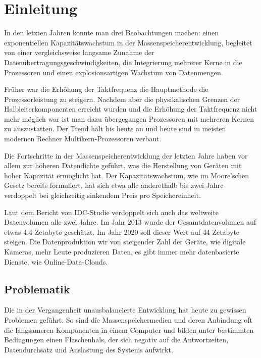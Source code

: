 
\section{Einleitung}
In den letzten Jahren konnte man drei Beobachtungen machen: einen exponentiellen Kapazitätswachstum in der Massenspeicherentwicklung, begleitet von einer vergleichsweise langsame Zunahme der Datenübertragungsgeschwindigkeiten, die Integrierung mehrerer Kerne in die Prozessoren und einen explosionsartigen Wachstum von Datenmengen.

Früher war die Erhöhung der Taktfrequenz die Hauptmethode die Prozessorleistung zu steigern. Nachdem aber die physikalischen Grenzen der Halbleiterkomponenten erreicht wurden und die Erhöhung der Taktfrequenz nicht mehr möglich war ist man dazu übergegangen Prozessoren mit mehreren Kernen zu auszustatten. Der Trend hält bis heute an und heute sind in meisten modernen Rechner Multikern-Prozessoren verbaut.

Die Fortschritte in der Massenspeicherentwicklung der letzten Jahre haben vor allem zur höheren Datendichte geführt, was die Herstellung von Geräten mit hoher Kapazität ermöglicht hat. Der Kapazitätswachstum, wie im Moore'schen Gesetz bereits formuliert, hat sich etwa alle anderethalb bis zwei Jahre verdoppelt bei gleichzeitig sinkendem Preis pro Speichereinheit.

Laut dem Bericht von IDC-Studie \cite{idc} verdoppelt sich auch das weltweite Datenvolumen alle zwei Jahre. Im Jahr 2013 wurde der Gesamtdatenvolumen auf etwas 4.4 Zetabyte geschätzt. Im Jahr 2020 soll dieser Wert auf 44 Zetabyte steigen. Die Datenproduktion wir von steigender Zahl der Geräte, wie digitale Kameras, mehr Leute produzieren Daten, es gibt immer mehr datenbasierte Dienste, wie Online-Data-Clouds.


\subsection{Problematik}
Die in der Vergangenheit unausbalancierte Entwicklung hat heute zu gewissen Problemen geführt.
So sind die Massenspeichermedien und deren Anbindung oft die langsameren Komponenten in einem Computer und bilden unter bestimmten Bedingungen einen Flaschenhals, der sich negativ auf die Antwortzeiten, Datendurchsatz und Auslastung des Systems aufwirkt. 

